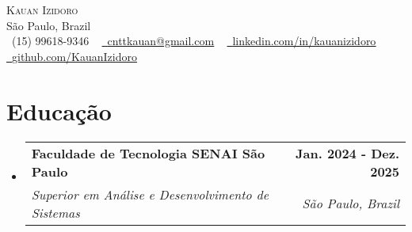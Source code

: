 \documentclass[letterpaper,11pt]{article}
\makeatletter
\newcommand{\resumeSubheading}[4]{
  \vspace{-2pt}\item
    \begin{tabular*}{1.0\textwidth}[t]{l@{\extracolsep{\fill}}r}
      \textbf{#1} & \textbf{\small #2} \\
      \textit{\small#3} & \textit{\small #4} \\
    \end{tabular*}\vspace{-7pt}
}
\newcommand{\resumeSubHeadingListStart}{\begin{itemize}[leftmargin=0.0in, label={}]}
\newcommand{\resumeSubHeadingListEnd}{\end{itemize}}
\makeatother
\begin{document}

\begin{center}
    {\Huge \scshape Kauan Izidoro} \\ \vspace{1pt}
    São Paulo, Brazil \\ \vspace{1pt}
    \small \raisebox{-0.1\height}\faPhone\ (15) 99618-9346 ~ \href{mailto:x@gmail.com}{\raisebox{-0.2\height}\faEnvelope\  \underline{cnttkauan@gmail.com}} ~ 
    \href{https://linkedin.com/in//}{\raisebox{-0.2\height}\faLinkedin\ \underline{linkedin.com/in/kauanizidoro}}  ~
    \href{https://github.com/}{\raisebox{-0.2\height}\faGithub\ \underline{github.com/KauanIzidoro}}
    \vspace{-8pt}
\end{center}


\section{Educação}
  \resumeSubHeadingListStart
    \resumeSubheading
      {Faculdade de Tecnologia SENAI São Paulo}{Jan. 2024 - Dez. 2025}
      {Superior em Análise e Desenvolvimento de Sistemas}{São Paulo, Brazil}
  \resumeSubHeadingListEnd

\end{document}
